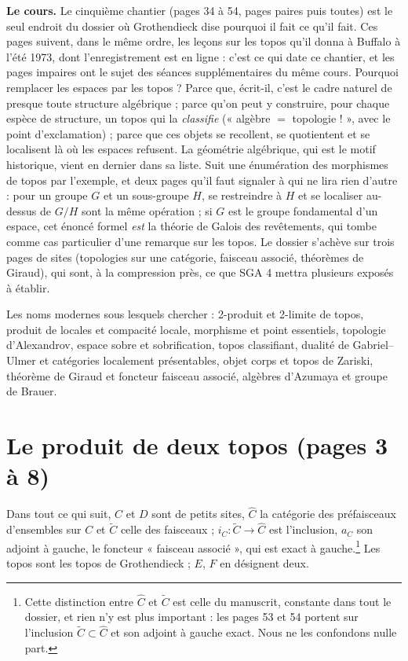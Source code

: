 \documentclass[11pt,a4paper]{article}
\begin{document}
\begin{resume}
\textbf{Le cours.} Le cinquième chantier (pages 34 à 54, pages paires puis
toutes) est le seul endroit du dossier où Grothendieck dise pourquoi il fait ce
qu'il fait. Ces pages suivent, dans le même ordre, les leçons sur les topos
qu'il donna à Buffalo à l'été 1973, dont l'enregistrement est en ligne : c'est
ce qui date ce chantier, et les pages impaires ont le sujet des séances
supplémentaires du même cours. Pourquoi remplacer les espaces par les topos ? Parce que, écrit-il,
c'est le cadre naturel de presque toute structure algébrique ; parce qu'on peut
y construire, pour chaque espèce de structure, un topos qui la \emph{classifie}
(« algèbre $=$ topologie ! », avec le point d'exclamation) ; parce que ces
objets se recollent, se quotientent et se localisent là où les espaces
refusent. La géométrie algébrique, qui est le motif historique, vient en
dernier dans sa liste. Suit une énumération des morphismes de topos par
l'exemple, et deux pages qu'il faut signaler à qui ne lira rien d'autre : pour
un groupe $G$ et un sous-groupe $H$, se restreindre à $H$ et se localiser
au-dessus de $G/H$ sont la même opération ; si $G$ est le groupe fondamental
d'un espace, cet énoncé formel \emph{est} la théorie de Galois des revêtements,
qui tombe comme cas particulier d'une remarque sur les topos. Le dossier
s'achève sur trois pages de sites (topologies sur une catégorie, faisceau
associé, théorèmes de Giraud), qui sont, à la compression près, ce que SGA 4
mettra plusieurs exposés à établir.


Les noms modernes sous lesquels chercher : 2-produit et 2-limite de topos,
produit de locales et compacité locale, morphisme et point essentiels,
topologie d'Alexandrov, espace sobre et sobrification, topos classifiant,
dualité de Gabriel--Ulmer et catégories localement présentables, objet corps et
topos de Zariski, théorème de Giraud et foncteur faisceau associé, algèbres
d'Azumaya et groupe de Brauer.

\end{resume}


\section*{Le produit de deux topos (pages 3 à 8)}

Dans tout ce qui suit, $C$ et $D$ sont de petits sites, $\widehat{C}$ la catégorie
des préfaisceaux d'ensembles sur $C$ et $\widetilde{C}$ celle des faisceaux ;
$i_{C} : \widetilde{C} \to \widehat{C}$ est l'inclusion, $a_{C}$ son adjoint à
gauche, le foncteur « faisceau associé », qui est exact à
gauche.\footnote{Cette distinction entre $\widehat{C}$ et $\widetilde{C}$ est
celle du manuscrit, constante dans tout le dossier, et rien n'y est plus
important : les pages 53 et 54 portent sur l'inclusion
$\widetilde{C} \subset \widehat{C}$ et son adjoint à gauche exact. Nous ne les
confondons nulle part.} Les topos sont les topos de Grothendieck ; $E$, $F$
en désignent deux.
\end{document}
